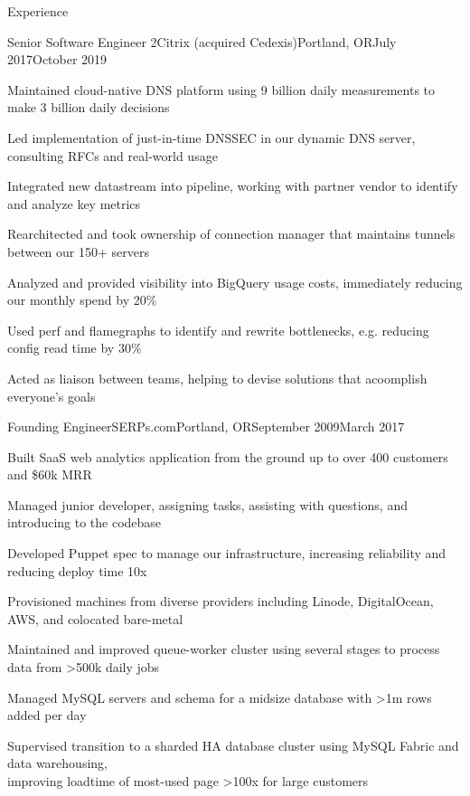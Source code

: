 \documentclass[letterpaper,10pt]{article}
\begin{document}
\begin{res_section}{Experience}
  \begin{res_experienceitem}{Senior Software Engineer 2}{Citrix (acquired Cedexis)}{Portland, OR}{July 2017}{October 2019}
  \item Maintained cloud-native DNS platform using 9 billion daily measurements to make 3 billion daily decisions
  \item Led implementation of just-in-time DNSSEC in our dynamic DNS server, consulting RFCs and real-world usage
  \item Integrated new datastream into pipeline, working with partner vendor to identify and analyze key metrics
  \item Rearchitected and took ownership of connection manager that maintains tunnels between our 150+ servers
  \item Analyzed and provided visibility into BigQuery usage costs, immediately reducing our monthly spend by 20\%
  \item Used perf and flamegraphs to identify and rewrite bottlenecks, e.g. reducing config read time by 30\%
  \item Acted as liaison between teams, helping to devise solutions that acoomplish everyone's goals
\end{res_experienceitem}
\begin{res_experienceitem}{Founding Engineer}{SERPs.com}{Portland, OR}{September 2009}{March 2017}
  \item Built SaaS web analytics application from the ground up to over 400 customers and \$60k MRR
  \item Managed junior developer, assigning tasks, assisting with questions, and introducing to the codebase
  \item Developed Puppet spec to manage our infrastructure, increasing reliability and reducing deploy time 10x
  \item Provisioned machines from diverse providers including Linode, DigitalOcean, AWS, and colocated bare-metal
  \item Maintained and improved queue-worker cluster using several stages to process data from \textgreater500k daily jobs
  \item Managed MySQL servers and schema for a midsize database with \textgreater1m rows added per day
  \item Supervised transition to a sharded HA database cluster using MySQL Fabric and data warehousing,\\
        improving loadtime of most-used page \textgreater100x for large customers

\end{res_experienceitem}
\end{res_section}
\end{document}
